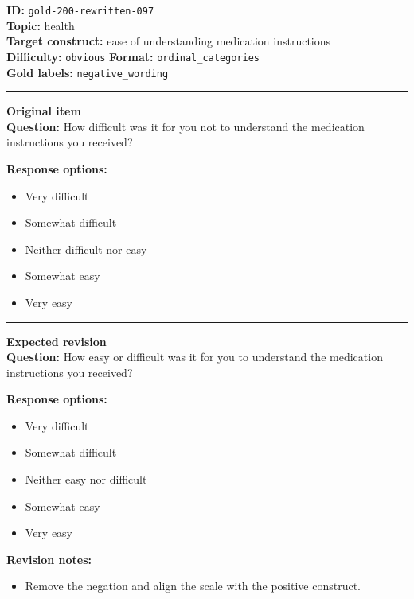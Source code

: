 \documentclass[10pt,a4paper]{article}
\newcommand{\sectionline}{\vspace{0.15em}\hrule\vspace{0.35em}}
\begin{document}
\begin{tcolorbox}[colframe=FlawRed,colback=white,colbacktitle=FlawRed!9,coltitle=black,title={Item 097\hfill Flawed item}]
\textbf{ID:} \texttt{gold-200-rewritten-097}\\
\textbf{Topic:} health\\
\textbf{Target construct:} ease of understanding medication instructions\\
\textbf{Difficulty:} \texttt{obvious} \quad \textbf{Format:} \texttt{ordinal\_categories}\\
\textbf{Gold labels:} \texttt{negative\_wording}\\
\sectionline
\textbf{Original item}\\
\textbf{Question:} How difficult was it for you not to understand the medication instructions you received?
\par\textbf{Response options:}
\begin{itemize}
\item Very difficult
\item Somewhat difficult
\item Neither difficult nor easy
\item Somewhat easy
\item Very easy
\end{itemize}
\sectionline
\textbf{Expected revision}\\
\textbf{Question:} How easy or difficult was it for you to understand the medication instructions you received?
\par\textbf{Response options:}
\begin{itemize}
\item Very difficult
\item Somewhat difficult
\item Neither easy nor difficult
\item Somewhat easy
\item Very easy
\end{itemize}
\par\textbf{Revision notes:}
\begin{itemize}
\item Remove the negation and align the scale with the positive construct.
\end{itemize}
\end{tcolorbox}
\end{document}
